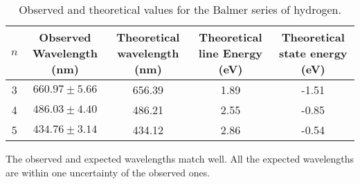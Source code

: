 \begin{table}[h]
    \centering
    \begin{adjustbox}{width=1.5\textwidth, center}
        \begin{tabular}{|c|c|c|c|c|}
            \hline
            $n$ & Observed Wavelength (nm) & Theoretical wavelength (nm) & Theoretical line Energy (eV) & Theoretical state energy (eV) \\
            \hline
            3   & $660.97 \pm 5.66$        & 656.39                      & 1.89                         & -1.51                         \\
            4   & $486.03 \pm 4.40$        & 486.21                      & 2.55                         & -0.85                         \\
            5   & $434.76 \pm 3.14$        & 434.12                      & 2.86                         & -0.54                         \\
            \hline
        \end{tabular}
    \end{adjustbox}
    \caption{Observed and theoretical values for the Balmer series of hydrogen.}
    \label{tab:my_label}
\end{table}


The observed and expected wavelengths match well. All the expected wavelengths are within one uncertainty of the observed ones.